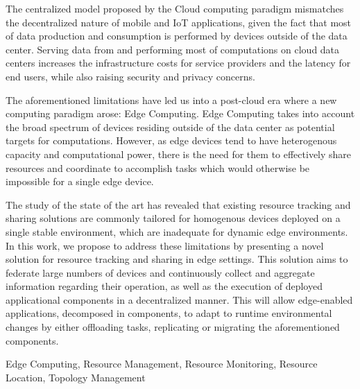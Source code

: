 

The centralized model proposed by the Cloud computing paradigm mismatches the decentralized nature of mobile and IoT applications, given the fact that most of data production and consumption is performed by devices outside of the data center. Serving data from and performing most of computations on cloud data centers increases the infrastructure costs for service providers and the latency for end users, while also raising security and privacy concerns. 

The aforementioned limitations have led us into a post-cloud era where a new computing paradigm arose: Edge Computing. Edge Computing takes into account the broad spectrum of devices residing outside of the data center as potential targets for computations. However, as edge devices tend to have heterogenous capacity and computational power, there is the need for them to effectively share resources and coordinate to accomplish tasks which would otherwise be impossible for a single edge device. 

The study of the state of the art has revealed that existing resource tracking and sharing solutions are commonly tailored for homogenous devices deployed on a single stable environment, which are inadequate for dynamic edge environments. In this work, we propose to address these limitations by presenting a novel solution for resource tracking and sharing in edge settings. This solution aims to federate large numbers of devices and continuously collect and aggregate information regarding their operation, as well as the
execution of deployed applicational components in a decentralized manner. This will allow edge-enabled applications, decomposed in components, to adapt to runtime environmental changes by either offloading tasks, replicating or migrating the aforementioned components.

\begin{keywords}
  Edge Computing, Resource Management, Resource Monitoring, Resource Location, Topology Management
\end{keywords} 
